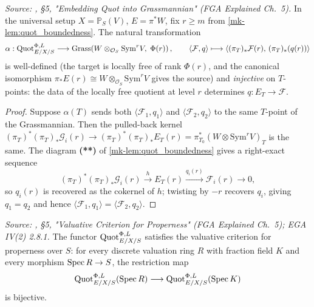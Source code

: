 \begin{lemma}
  \label{mk-lem:quot_alpha_injective}

  \textit{Source: \cite{nitsure-hilbert-quot}, \S 5, "Embedding Quot into Grassmannian"
  (FGA Explained Ch.~5).}
  In the universal setup \(X = \mathbb{P}_S(V)\), \(E = \pi^* W\), fix
  \(r \ge m\) from \ref{mk-lem:quot_boundedness}. The natural transformation
  \[
    \alpha :
    \operatorname{Quot}^{\Phi,L}_{E/X/S} \longrightarrow
    \mathrm{Grass}\!\left(
      W \otimes_{\mathcal{O}_S} \mathrm{Sym}^r V,\; \Phi(r)
    \right),
    \qquad
    \langle \mathcal{F}, q\rangle \longmapsto
    \langle (\pi_T)_*\mathcal{F}(r),\, (\pi_T)_*(q(r))\rangle
  \]
  is well-defined (the target is locally free of rank \(\Phi(r)\), and the
  canonical isomorphism \(\pi_* E(r) \cong W \otimes_{\mathcal{O}_S}
  \mathrm{Sym}^r V\) gives the source) and \emph{injective} on \(T\)-points:
  the data of the locally free quotient at level \(r\) determines
  \(q : E_T \to \mathcal{F}\).
\end{lemma}

\begin{proof}

  Suppose \(\alpha(T)\) sends both \(\langle \mathcal{F}_1, q_1\rangle\) and
  \(\langle \mathcal{F}_2, q_2\rangle\) to the same \(T\)-point of the
  Grassmannian. Then the pulled-back kernel
  \((\pi_T)^* (\pi_T)_* \mathcal{G}_i(r) \to (\pi_T)^* (\pi_T)_* E_T(r)
  = \pi_{T_0}^* (W \otimes \mathrm{Sym}^r V)_T\)
  is the same. The diagram \textbf{(**)} of
  \ref{mk-lem:quot_boundedness} gives a right-exact sequence
  \[
    (\pi_T)^* (\pi_T)_* \mathcal{G}_i(r) \xrightarrow{h}
    E_T(r) \xrightarrow{q_i(r)} \mathcal{F}_i(r) \to 0,
  \]
  so \(q_i(r)\) is recovered as the cokernel of \(h\); twisting by \(-r\)
  recovers \(q_i\), giving \(q_1 = q_2\) and hence
  \(\langle \mathcal{F}_1, q_1\rangle = \langle \mathcal{F}_2, q_2\rangle\).
\end{proof}

\begin{lemma}
  \label{mk-lem:quot_valuative_criterion}

  \textit{Source: \cite{nitsure-hilbert-quot}, \S 5, "Valuative Criterion for Properness"
  (FGA Explained Ch.~5); EGA IV(2) 2.8.1.}
  The functor \(\operatorname{Quot}^{\Phi,L}_{E/X/S}\) satisfies the valuative criterion
  for properness over \(S\): for every discrete valuation ring \(R\) with
  fraction field \(K\) and every morphism \(\operatorname{Spec} R \to S\), the restriction
  map
  \[
    \operatorname{Quot}^{\Phi,L}_{E/X/S}(\operatorname{Spec} R)
    \longrightarrow
    \operatorname{Quot}^{\Phi,L}_{E/X/S}(\operatorname{Spec} K)
  \]
  is bijective.
\end{lemma}

